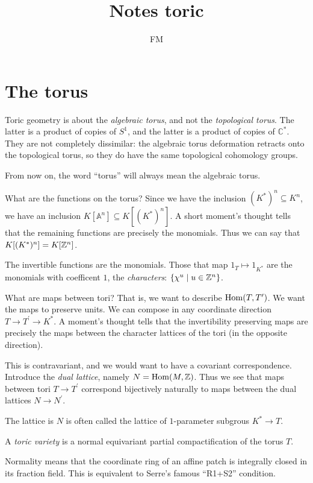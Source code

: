 \documentclass[11pt, english]{article}
\title{Notes toric}
\author{FM}
\date{}
\begin{document}
\maketitle

\section{The torus}

Toric geometry is about the \emph{algebraic torus}, and not the
\emph{topological torus}. The latter is a product of copies of $S^1$,
and the latter is a product of copies of $\mathbb{C}^\ast$. They are
not completely dissimilar: the algebraic torus deformation retracts
onto the topological torus, so they do have the same topological
cohomology groups.

From now on, the word ``torus'' will always mean the algebraic torus.

What are the functions on the torus? Since we have the inclusion
$(K^\ast)^n \subseteq K^n$, we have an inclusion $K[\mathbb A^n]
\subseteq K[(K^\ast)^n]$. A short moment's thought tells that the
remaining functions are precisely the monomials. Thus we can say that
$K[(K^\ast)^n]=K[\mathbb{Z}^n]$.

The invertible functions are the monomials. Those that map $1_T
\mapsto 1_{K^\ast}$ are the monomials with coefficent $1$, the
\emph{characters}: $\{ \chi^u \mid u \in \mathbb{Z}^n \}$. 

What are maps between tori? That is, we want to describe
$\operatorname{Hom}(T,T^\prime)$.  We want the maps to preserve units. We can
compose in any coordinate direction $T \to T^\prime \to K^\ast$. A
moment's thought tells that the invertibility preserving maps are
precisely the maps between the character lattices of the tori (in the
opposite direction).

This is contravariant, and we would want to have a covariant
correspondence. Introduce the \emph{dual lattice}, namely
$N=\operatorname{Hom}(M,\mathbb{Z})$. Thus we see that maps between tori $T \to T^\prime$ correspond
bijectively naturally to maps between the dual lattices $N \to N^\prime$.

The lattice is $N$ is often called the lattice of $1$-parameter
subgrous $K^\ast \to T$.

\begin{defi}
A \emph{toric variety} is a normal equivariant partial
compactification of the torus $T$.
\end{defi}

Normality means that the coordinate ring of an affine patch is
integrally closed in its fraction field. This is equivalent to Serre's
famous ``R1+S2'' condition. 
\end{document}
